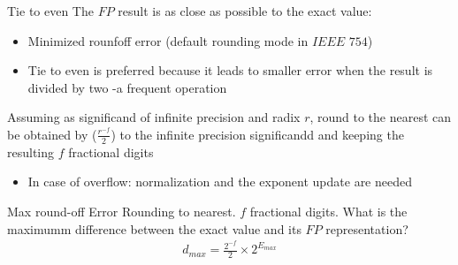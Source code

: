 \begin{parag}{Tie to even}
    The $FP$ result is as close as possible to the exact value:
    \begin{itemize}
        \item Minimized rounfoff error (default rounding mode in $IEEE$ $754$)
        \item Tie to even is preferred because it leads to smaller error when the result is divided by two -a frequent operation
    \end{itemize}
    Assuming as significand of infinite precision and radix $r$, round to the nearest can be obtained by  ($ \frac{r^{-f}}{2}$) to the infinite precision significandd and keeping the resulting $f$ fractional digits
    \begin{itemize}
        \item In case of overflow: normalization and the exponent update are needed
    \end{itemize}

\end{parag}

\begin{parag}{Max round-off Error}
    Rounding to nearest. $f$ fractional digits. What is the maximumm difference between the exact value and its $FP$ representation?
    \\
    \begin{align*}
        d_{max} = \frac{2^{-f}}{2} \times 2^{E_{max}}
    \end{align*}
    

\end{parag}
































